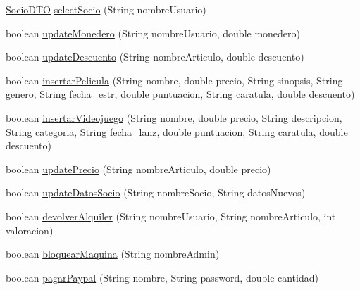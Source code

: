 \begin{DoxyCompactItemize}
\item 
\mbox{\hyperlink{classes_1_1deusto_1_1server_1_1dto_1_1_socio_d_t_o}{Socio\+D\+TO}} \mbox{\hyperlink{classes_1_1deusto_1_1server_1_1services_1_1_app_service_d_b_ad57719d5fdb8d08686570dff17edb8a0}{select\+Socio}} (String nombre\+Usuario)
\item 
boolean \mbox{\hyperlink{classes_1_1deusto_1_1server_1_1services_1_1_app_service_d_b_acc1227082742b137a82096bca5b6945c}{update\+Monedero}} (String nombre\+Usuario, double monedero)
\item 
boolean \mbox{\hyperlink{classes_1_1deusto_1_1server_1_1services_1_1_app_service_d_b_a4839aca5b2ad04a8fc7616d1b96532e2}{update\+Descuento}} (String nombre\+Articulo, double descuento)
\item 
boolean \mbox{\hyperlink{classes_1_1deusto_1_1server_1_1services_1_1_app_service_d_b_aae9559c56b0372139a47e7f647794ac2}{insertar\+Pelicula}} (String nombre, double precio, String sinopsis, String genero, String fecha\+\_\+estr, double puntuacion, String caratula, double descuento)
\item 
boolean \mbox{\hyperlink{classes_1_1deusto_1_1server_1_1services_1_1_app_service_d_b_a1e98f1cd6fde7ae6aaef7c90ebef4849}{insertar\+Videojuego}} (String nombre, double precio, String descripcion, String categoria, String fecha\+\_\+lanz, double puntuacion, String caratula, double descuento)
\item 
boolean \mbox{\hyperlink{classes_1_1deusto_1_1server_1_1services_1_1_app_service_d_b_aa379ab9cb99ad97983c8c9e02204b129}{update\+Precio}} (String nombre\+Articulo, double precio)
\item 
boolean \mbox{\hyperlink{classes_1_1deusto_1_1server_1_1services_1_1_app_service_d_b_aad5d78a40512a94a4ef5f6203810899b}{update\+Datos\+Socio}} (String nombre\+Socio, String datos\+Nuevos)
\item 
boolean \mbox{\hyperlink{classes_1_1deusto_1_1server_1_1services_1_1_app_service_d_b_ab32c2158089cff61db88b11619cce7f9}{devolver\+Alquiler}} (String nombre\+Usuario, String nombre\+Articulo, int valoracion)
\item 
boolean \mbox{\hyperlink{classes_1_1deusto_1_1server_1_1services_1_1_app_service_d_b_ad5abb10d1ef40b2ec6a00db392bce459}{bloquear\+Maquina}} (String nombre\+Admin)
\item 
boolean \mbox{\hyperlink{classes_1_1deusto_1_1server_1_1services_1_1_app_service_d_b_afc5b3243a3f9470c30aa88a034322233}{pagar\+Paypal}} (String nombre, String password, double cantidad)
\end{DoxyCompactItemize}


